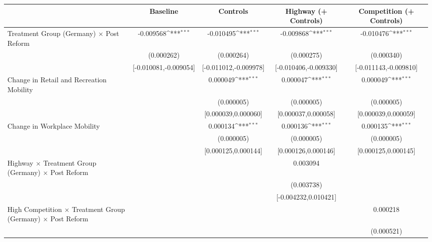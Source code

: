 {
\def\sym#1{\ifmmode^{#1}\else\(^{#1}\)\fi}
\begin{tabular}{l*{4}{c}}
\toprule
                    &\multicolumn{1}{c}{Baseline}&\multicolumn{1}{c}{Controls}&\multicolumn{1}{c}{Highway (+ Controls)}&\multicolumn{1}{c}{Competition (+ Controls)}\\
\midrule
Treatment Group (Germany) $\times$ Post Reform&   -0.009568\sym{***}&   -0.010495\sym{***}&   -0.009868\sym{***}&   -0.010476\sym{***}\\
                    &  (0.000262)         &  (0.000264)         &  (0.000275)         &  (0.000340)         \\
                    &[-0.010081,-0.009054]         &[-0.011012,-0.009978]         &[-0.010406,-0.009330]         &[-0.011143,-0.009810]         \\
Change in Retail and Recreation Mobility&                     &    0.000049\sym{***}&    0.000047\sym{***}&    0.000049\sym{***}\\
                    &                     &  (0.000005)         &  (0.000005)         &  (0.000005)         \\
                    &                     &[0.000039,0.000060]         &[0.000037,0.000058]         &[0.000039,0.000059]         \\
Change in Workplace Mobility&                     &    0.000134\sym{***}&    0.000136\sym{***}&    0.000135\sym{***}\\
                    &                     &  (0.000005)         &  (0.000005)         &  (0.000005)         \\
                    &                     &[0.000125,0.000144]         &[0.000126,0.000146]         &[0.000125,0.000145]         \\
Highway $\times$ Treatment Group (Germany) $\times$ Post Reform&                     &                     &    0.003094         &                     \\
                    &                     &                     &  (0.003738)         &                     \\
                    &                     &                     &[-0.004232,0.010421]         &                     \\
High Competition $\times$ Treatment Group (Germany) $\times$ Post Reform&                     &                     &                     &    0.000218         \\
                    &                     &                     &                     &  (0.000521)         \\

\end{tabular}}

